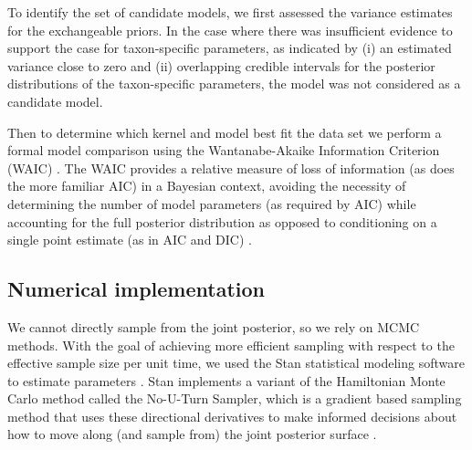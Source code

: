 \documentclass[12pt]{article}
\begin{document}
To identify the set of candidate models, we first assessed the
variance estimates for the exchangeable priors. In the case where
there was insufficient evidence to support the case for taxon-specific
parameters, as indicated by (i) an estimated variance close to zero
and (ii) overlapping credible intervals for the posterior
distributions of the taxon-specific parameters, the model was not
considered as a candidate model.

Then to determine which kernel and model best fit the data set we
perform a formal model comparison using the Wantanabe-Akaike
Information Criterion (WAIC) \citep{watanabe2010asymptotic}. The WAIC
provides a relative measure of loss of information (as does the more
familiar AIC) in a Bayesian context, avoiding the necessity of
determining the number of model parameters (as required by AIC) while
accounting for the full posterior distribution as opposed to
conditioning on a single point estimate (as in AIC and DIC)
\citep{gelman2014understanding}.

\subsection{Numerical implementation}

We cannot directly sample from the joint posterior, so we rely on MCMC
methods. With the goal of achieving more efficient sampling with
respect to the effective sample size per unit time, we used the Stan
statistical modeling software to estimate parameters
\citep{stan-software:2014}. Stan implements a variant of the
Hamiltonian Monte Carlo method called the No-U-Turn Sampler, which is
a gradient based sampling method that uses these directional
derivatives to make informed decisions about how to move along (and
sample from) the joint posterior surface \citep{hoffman2011nuts}.


\end{document}
